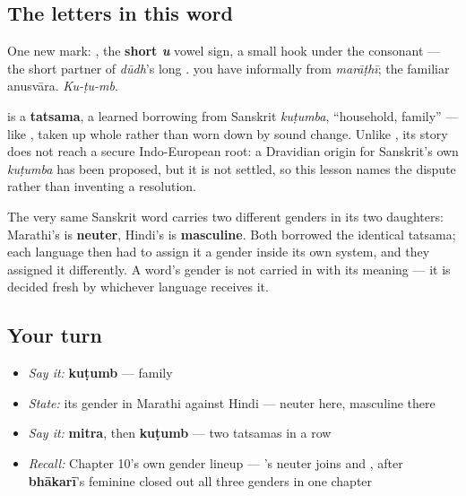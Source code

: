 \subsection*{The letters in this word}
One new mark: \textbf{}, the \textbf{short \emph{u}} vowel sign, a small hook under the consonant — the short partner of \emph{dūdh}'s long \textbf{}. \textbf{} you have informally from \emph{marāṭhī}; \textbf{} the familiar anusvāra. \emph{Ku-ṭu-mb}.

\begin{cousinweb}
\textbf{} is a \textbf{tatsama}, a learned borrowing from Sanskrit \textbf{} \emph{kuṭumba}, \textquotedblleft{}household, family\textquotedblright{} — like \textbf{}, taken up whole rather than worn down by sound change. Unlike \textbf{}, its story does not reach a secure Indo-European root: a Dravidian origin for Sanskrit's own \emph{kuṭumba} has been proposed, but it is not settled, so this lesson names the dispute rather than inventing a resolution.
\end{cousinweb}

\begin{grammarlens}[title={Grammar Lens: a gender Hindi disagrees with}]
The very same Sanskrit word carries two different genders in its two daughters: Marathi's \textbf{} is \textbf{neuter}, Hindi's \textbf{} is \textbf{masculine}. Both borrowed the identical tatsama; each language then had to assign it a gender inside its own system, and they assigned it differently. A word's gender is not carried in with its meaning — it is decided fresh by whichever language receives it.
\end{grammarlens}

\subsection*{Your turn}
\begin{itemize}
\raggedright
  \item \emph{Say it:} \textbf{kuṭumb} — family
  \item \emph{State:} its gender in Marathi against Hindi — neuter here, masculine there
  \item \emph{Say it:} \textbf{mitra}, then \textbf{kuṭumb} — two tatsamas in a row
  \item \emph{Recall:} Chapter 10's own gender lineup — \textbf{}'s neuter joins \textbf{} and \textbf{}, after \textbf{bhākarī}'s feminine closed out all three genders in one chapter
\end{itemize}

